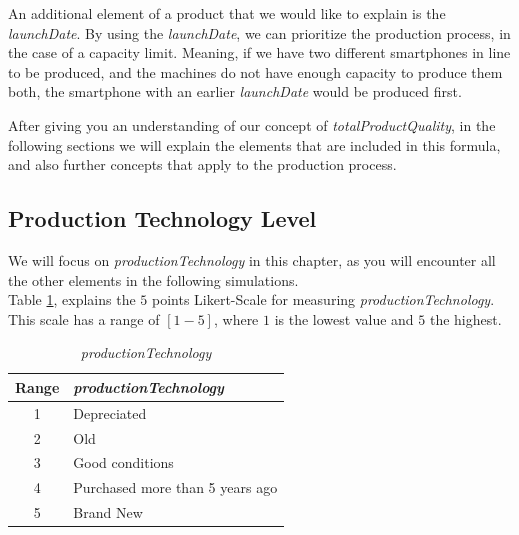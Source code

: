  An additional element of a product that we would like to explain is the \textit{launchDate}. By using the \textit{launchDate}, we can prioritize the production process, in the case of a capacity limit. Meaning, if we have two different smartphones in line to be produced, and the machines do not have enough capacity to produce them both, the smartphone with an earlier \textit{launchDate} would be produced first.

After giving you an understanding of our concept of  \textit{totalProductQuality}, in the following sections we will explain the elements that  are included in this formula, and also further concepts that apply to the production process.

\subsection{Production Technology Level}
We will focus on \textit{productionTechnology} in this chapter, as you will encounter all the other elements in the following simulations. \\
Table \ref{table:my-label}, explains the $5$ points Likert-Scale for measuring \textit{productionTechnology}. This scale has a range of $[1-5]$, where $1$ is the lowest value and $5$ the highest.

\begin{table}[ht]
\centering
\begin{tabular}{|c|l|}
\hline
 Range & \textit{productionTechnology}\\
\hline
 1 & Depreciated  \\
 2 & Old \\
 3 & Good conditions \\
 4 & Purchased more than 5 years ago  \\
 5 & Brand New\\
\hline
\end{tabular}
\caption{\textit{productionTechnology}}
\label{table:my-label}
\end{table}

